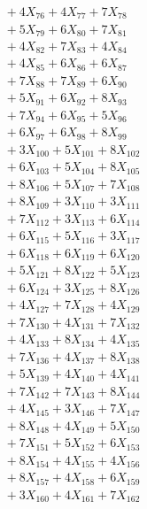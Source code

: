 \documentclass[a4paper,10pt]{article}
\begin{document}
{\begin{align}
&\;  + 4 X_{76} + 4 X_{77} + 7 X_{78} \\[0.3ex]
&\;  + 5 X_{79} + 6 X_{80} + 7 X_{81} \\[0.3ex]
&\;  + 4 X_{82} + 7 X_{83} + 4 X_{84} \\[0.3ex]
&\;  + 4 X_{85} + 6 X_{86} + 6 X_{87} \\[0.3ex]
&\;  + 7 X_{88} + 7 X_{89} + 6 X_{90} \\[0.3ex]
&\;  + 5 X_{91} + 6 X_{92} + 8 X_{93} \\[0.3ex]
&\;  + 7 X_{94} + 6 X_{95} + 5 X_{96} \\[0.3ex]
&\;  + 6 X_{97} + 6 X_{98} + 8 X_{99} \\[0.5ex]\allowbreak
&\;  + 3 X_{100} + 5 X_{101} + 8 X_{102} \\[0.3ex]
&\;  + 6 X_{103} + 5 X_{104} + 8 X_{105} \\[0.3ex]
&\;  + 8 X_{106} + 5 X_{107} + 7 X_{108} \\[0.3ex]
&\;  + 8 X_{109} + 3 X_{110} + 3 X_{111} \\[0.3ex]
&\;  + 7 X_{112} + 3 X_{113} + 6 X_{114} \\[0.3ex]
&\;  + 6 X_{115} + 5 X_{116} + 3 X_{117} \\[0.3ex]
&\;  + 6 X_{118} + 6 X_{119} + 6 X_{120} \\[0.3ex]
&\;  + 5 X_{121} + 8 X_{122} + 5 X_{123} \\[0.3ex]
&\;  + 6 X_{124} + 3 X_{125} + 8 X_{126} \\[0.3ex]
&\;  + 4 X_{127} + 7 X_{128} + 4 X_{129} \\[0.5ex]\allowbreak
&\;  + 7 X_{130} + 4 X_{131} + 7 X_{132} \\[0.3ex]
&\;  + 4 X_{133} + 8 X_{134} + 4 X_{135} \\[0.3ex]
&\;  + 7 X_{136} + 4 X_{137} + 8 X_{138} \\[0.3ex]
&\;  + 5 X_{139} + 4 X_{140} + 4 X_{141} \\[0.3ex]
&\;  + 7 X_{142} + 7 X_{143} + 8 X_{144} \\[0.3ex]
&\;  + 4 X_{145} + 3 X_{146} + 7 X_{147} \\[0.3ex]
&\;  + 8 X_{148} + 4 X_{149} + 5 X_{150} \\[0.3ex]
&\;  + 7 X_{151} + 5 X_{152} + 6 X_{153} \\[0.3ex]
&\;  + 8 X_{154} + 4 X_{155} + 4 X_{156} \\[0.3ex]
&\;  + 8 X_{157} + 4 X_{158} + 6 X_{159} \\[0.5ex]\allowbreak
&\;  + 3 X_{160} + 4 X_{161} + 7 X_{162} \\[0.3ex]

\end{align}}
\end{document}
